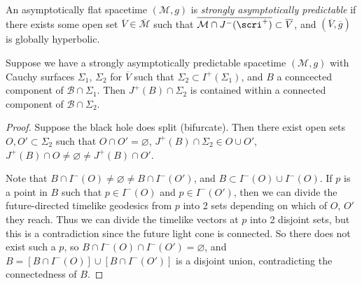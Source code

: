 \documentclass{jknotes}
\begin{document}
\begin{defn}
    An asymptotically flat spacetime \((\mathcal{M},g)\) is \emph{strongly asymptotically predictable} if there exists some open set \(\overline{V}\in\overline{\mathcal{M}}\) such that \(\overline{\mathcal{M}\cap J^-(\scri^+)} \subset \overline{V}\), and \((\overline{V},\overline{g})\) is globally hyperbolic.
\end{defn}

\begin{theorem}
    Suppose we have a strongly asymptotically predictable spacetime \((\mathcal{M},g)\) with Cauchy surfaces \(\Sigma_1\), \(\Sigma_2\) for \(\overline{V}\) such that \(\Sigma_2\subset I^+(\Sigma_1)\), and \(B\) a conncected component of \(\mathcal{B}\cap\Sigma_1\). Then \(J^+(B)\cap\Sigma_2\) is contained within a connected component of \(\mathcal{B}\cap\Sigma_2\).
\end{theorem}
\begin{proof}
    Suppose the black hole does split (bifurcate). Then there exist open sets \(O,O'\subset \Sigma_2\) such that \(O\cap O' = \varnothing\), \(J^+(B)\cap\Sigma_2\in O\cup O'\), \(J^+(B)\cap O \ne \varnothing \ne J^+(B)\cap O'\).
    \begin{figure}[H]
        \centering
    \end{figure}
    Note that \(B\cap I^-(O) \ne \varnothing \ne B\cap I^-(O')\), and \(B\subset I^-(O)\cup I^-(O)\). If \(p\) is a point in \(B\) such that \(p\in I^-(O)\) and \(p\in I^-(O')\), then we can divide the future-directed timelike geodesics from \(p\) into 2 sets depending on which of \(O\), \(O'\) they reach. Thus we can divide the timelike vectors at \(p\) into 2 disjoint sets, but this is a contradiction since the future light cone is connected. So there does not exist such a \(p\), so \(B\cap I^-(O)\cap I^-(O')=\varnothing\), and \(B=[B\cap I^-(O)]\cup[B\cap I^-(O')]\) is a disjoint union, contradicting the connectedness of \(B\).
\end{proof}
\end{document}
